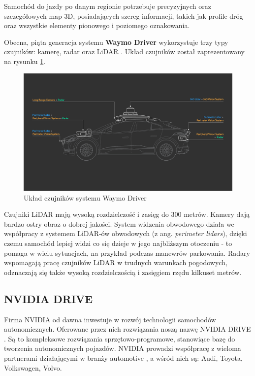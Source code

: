 Samochód do jazdy po danym regionie potrzebuje precyzyjnych oraz szczegółowych map 3D, posiadających szereg informacji, takich jak profile dróg oraz wszystkie elementy pionowego i poziomego oznakowania.

Obecna, piąta generacja systemu \textbf{Waymo Driver} wykorzystuje trzy typy czujników: kamerę, radar oraz LiDAR \cite{waymoDriver:5thGenSensors}. Układ czujników został zaprezentowany na rysunku \ref{WaymoDriverSensors}. \\

\begin{figure}[h]
\begin{center}
\includegraphics[width=15cm]{resources/figures/waymo_driver_sensors.png}
\caption{Układ czujników systemu Waymo Driver}
\label{WaymoDriverSensors}
\end{center}
\end{figure}

Czujniki LiDAR mają wysoką rozdzielczość i zasięg do 300 metrów. Kamery dają bardzo ostry obraz o dobrej jakości. System widzenia obwodowego działa we współpracy z systemem LiDAR-ów obwodowych (z ang. \textit{perimeter lidars}), dzięki czemu samochód lepiej widzi co się dzieje w jego najbliższym otoczeniu - to pomaga w wielu sytuacjach, na przykład podczas manewrów parkowania. Radary wspomagają pracę czujników LiDAR w trudnych warunkach pogodowych, odznaczają się także wysoką rozdzielczością i zasięgiem rzędu kilkuset metrów.

\subsection{NVIDIA DRIVE}
Firma NVIDIA od dawna inwestuje w rozwój technologii samochodów autonomicznych. Oferowane przez nich rozwiązania noszą nazwę NVIDIA DRIVE \cite{nvidiaDrive:overview}. Są to kompleksowe rozwiązania sprzętowo-programowe, stanowiące bazę do tworzenia autonomicznych pojazdów. NVIDIA prowadzi współpracę z wieloma partnerami działającymi w branży automotive \cite{nvidiaDrive:partners}, a wśród nich są: Audi, Toyota, Volkswagen, Volvo.

